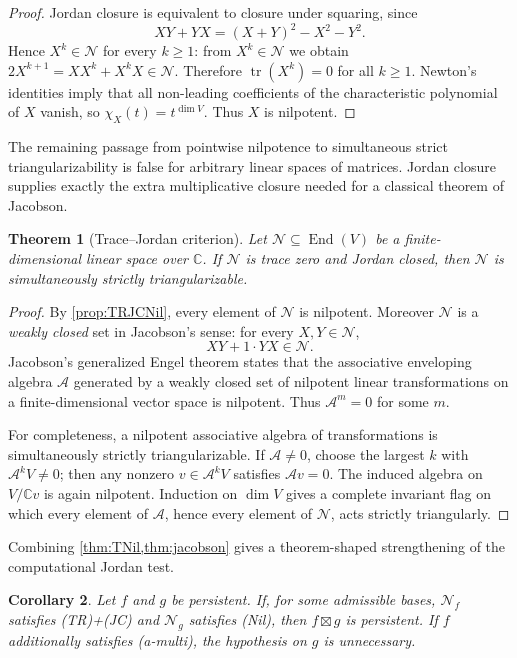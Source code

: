 \documentclass[11pt]{amsart}
\newtheorem{theorem}{Theorem}[section]
\newtheorem{corollary}[theorem]{Corollary}
\newcommand{\C}{\mathbb C}
\newcommand{\End}{\operatorname{End}}
\newcommand{\tr}{\operatorname{tr}}
\newcommand{\boxt}{\mathbin{\boxtimes}}
\newcommand{\Nsp}{\mathcal N}
\begin{document}
\begin{proof}
Jordan closure is equivalent to closure under squaring, since
\[
 XY+YX=(X+Y)^2-X^2-Y^2.
\]
Hence $X^k\in\Nsp$ for every $k\ge1$: from $X^k\in\Nsp$ we obtain
$2X^{k+1}=XX^k+X^kX\in\Nsp$.  Therefore
$\tr(X^k)=0$ for all $k\ge1$.  Newton's identities imply that all non-leading
coefficients of the characteristic polynomial of $X$ vanish, so
$\chi_X(t)=t^{\dim V}$.  Thus $X$ is nilpotent.
\end{proof}

The remaining passage from pointwise nilpotence to simultaneous strict
triangularizability is false for arbitrary linear spaces of matrices.  Jordan
closure supplies exactly the extra multiplicative closure needed for a classical
theorem of Jacobson.

\begin{theorem}[Trace--Jordan criterion]\label{thm:jacobson}
Let $\Nsp\subseteq\End(V)$ be a finite-dimensional linear space over $\C$.
If $\Nsp$ is trace zero and Jordan closed, then $\Nsp$ is simultaneously
strictly triangularizable.
\end{theorem}

\begin{proof}
By \cref{prop:TRJCNil}, every element of $\Nsp$ is nilpotent.  Moreover
$\Nsp$ is a \emph{weakly closed} set in Jacobson's sense: for every
$X,Y\in\Nsp$,
\[
 XY+1\cdot YX\in\Nsp.
\]
Jacobson's generalized Engel theorem \cite{J52,J62} states that the associative
enveloping algebra $\mathcal A$ generated by a weakly closed set of nilpotent
linear transformations on a finite-dimensional vector space is nilpotent.
Thus $\mathcal A^m=0$ for some $m$.

For completeness, a nilpotent associative algebra of transformations is
simultaneously strictly triangularizable.  If $\mathcal A\neq0$, choose the
largest $k$ with $\mathcal A^kV\neq0$; then any nonzero
$v\in\mathcal A^kV$ satisfies $\mathcal A v=0$.  The induced algebra on
$V/\C v$ is again nilpotent.  Induction on $\dim V$ gives a complete invariant
flag on which every element of $\mathcal A$, hence every element of $\Nsp$,
acts strictly triangularly.
\end{proof}

Combining \cref{thm:TNil,thm:jacobson} gives a theorem-shaped strengthening of
the computational Jordan test.

\begin{corollary}\label{cor:TRJC-product}
Let $f$ and $g$ be persistent.  If, for some admissible bases, $\Nsp_f$ satisfies
(TR)+(JC) and $\Nsp_g$ satisfies (Nil), then $f\boxt g$ is persistent.  If
$f$ additionally satisfies (a-multi), the hypothesis on $g$ is unnecessary.
\end{corollary}
\end{document}
